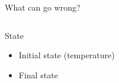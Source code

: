\documentclass{beamer}
\begin{document}

\begin{frame}{What can go wrong?}
  \begin{columns}
    \column{5cm}
    \begin{block}{State}
      \begin{itemize}
      \item<2-> Initial state (temperature)
      \item<3-> Final state
      \end{itemize}
    \end{block}
    \column{7cm}
    \vspace{-0.7cm}
    \begin{center}
    \end{center}
  \end{columns}
\end{frame}
\end{document}

